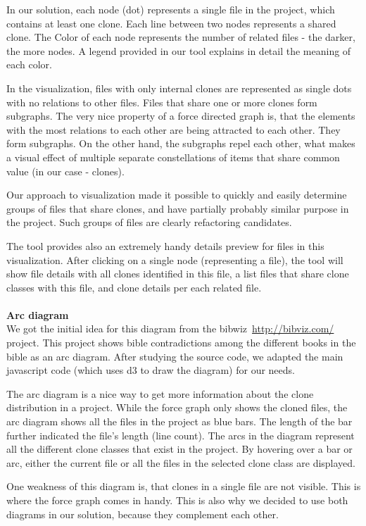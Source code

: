 \documentclass{uva-inf-article}
\begin{document}
In our solution, each node (dot) represents a single file in the project, which contains at least one clone. Each line between two nodes represents a shared clone. The Color of each node represents the number of related files - the darker, the more nodes. A legend provided in our tool explains in detail the meaning of each color. 

In the visualization, files with only internal clones are represented as single dots with no relations to other files. Files that share one or more clones form subgraphs. The very nice property of a force directed graph is, that the elements with the most relations to each other are being attracted to each other. They form subgraphs. On the other hand, the subgraphs repel each other, what makes a visual effect of multiple separate constellations of items that share common value (in our case - clones). 

Our approach to visualization made it possible to quickly and easily determine groups of files that share clones, and have partially probably similar purpose in the project. Such groups of files are clearly refactoring candidates. 

The tool provides also an extremely handy details preview for files in this visualization. After clicking on a single node (representing a file), the tool will show file details with all clones identified in this file, a list files that share clone classes with this file, and clone details per each related file. 
\\\\
\textbf{Arc diagram} 
\\
We got the initial idea for this diagram from the bibwiz\
{\url{http://bibviz.com/}} project. This project shows bible contradictions among the different books in the bible as an arc diagram. After studying the source code, we adapted the main javascript code (which uses d3 to draw the diagram) for our needs.

The arc diagram is a nice way to get more information about the clone distribution in a project. While the force graph only shows the cloned files, the arc diagram shows all the files in the project as blue bars. The length of the bar further indicated the file's length (line count). The arcs in the diagram represent all the different clone classes that exist in the project. By hovering over a bar or arc, either the current file or all the files in the selected clone class are displayed.

One weakness of this diagram is, that clones in a single file are not visible. This is where the force graph comes in handy. This is also why we decided to use both diagrams in our solution, because they complement each other.
\end{document}
